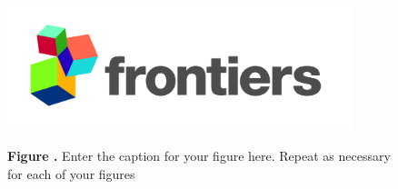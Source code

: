 \documentclass{frontiersSCNS} %
\begin{document}
\begin{figure}[ht!]
\begin{center}
\includegraphics[width=10cm]{logo1}%
\end{center}
 \textbf{\label{fig:01} Figure .}{ Enter the caption for your figure here.  Repeat as  necessary for each of your figures }
\end{figure}





\end{document}
